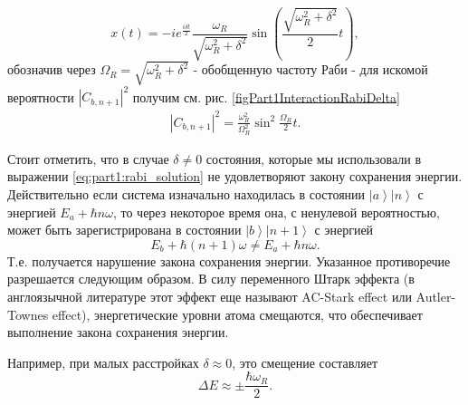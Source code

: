 \begin{equation}
  x\left(t\right) = -  i e^{\frac{ i \delta t}{2}}
  \frac{\omega_R}{\sqrt{\omega_R^2 + \delta^2}}
  \sin{\left(\frac{\sqrt{\omega_R^2 + \delta^2}}{2}t\right)},
  \nonumber
\end{equation}
обозначив через $\Omega_R = \sqrt{\omega_R^2 + \delta^2}$ -
обобщенную частоту Раби - для искомой вероятности
$\left|C_{b,n+1}\right|^2$ получим см. рис. \ref{figPart1InteractionRabiDelta}
\begin{eqnarray}
  \left|C_{b,n+1}\right|^2 =  \frac{\omega_R^2}{\Omega_R^2}
  \sin^2{\frac{\Omega_R}{2} t}.
  \label{eqPart1InteractionRabiProbability}
\end{eqnarray}



\begin{remark}
  Стоит отметить, что в случае $\delta \ne 0$ состояния, которые мы
  использовали в выражении \ref{eq:part1:rabi_solution} не
  удовлетворяют закону сохранения энергии. Действительно если система
  изначально находилась в состоянии $\left|a\right>\left|n\right>$ с
  энергией $E_a + \hbar n \omega$, то через некоторое время она,
  с ненулевой вероятностью,
  может
  быть зарегистрирована в состоянии
  $\left|b\right>\left|n+1\right>$ с энергией
  \[
  E_b + \hbar (n+1)
  \omega \ne E_a + \hbar n \omega.
  \]
  Т.е. получается нарушение закона
  сохранения энергии. Указанное противоречие разрешается следующим
  образом. В силу переменного Штарк эффекта
  (в англоязычной литературе этот эффект еще называют AC-Stark effect или
  Autler-Townes effect)\cite{wiki:autler_townes_effect},
  энергетические уровни атома смещаются, 
  что обеспечивает выполнение закона сохранения энергии.

  Например,
  при малых расстройках $\delta \approx 0$, это смещение составляет
  \cite{wiki:autler_townes_effect} 
  \[
  \Delta E \approx \pm \frac{\hbar \omega_R}{2}.
  \]
\end{remark}
